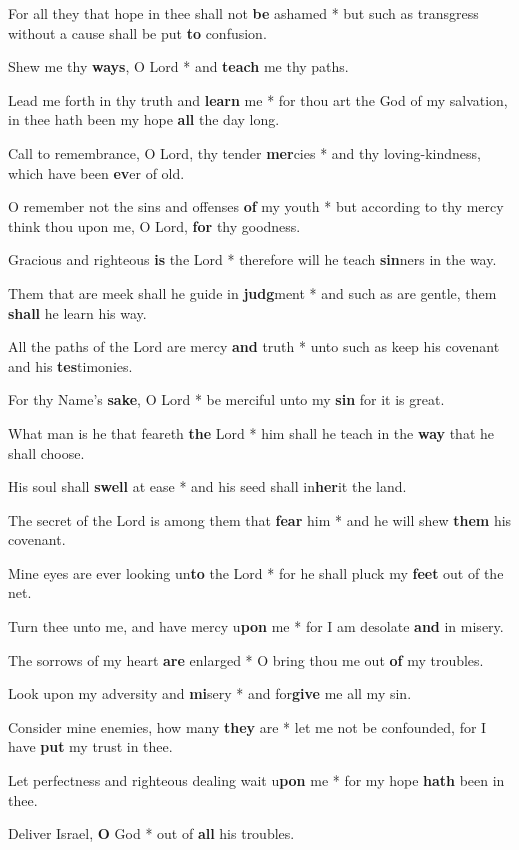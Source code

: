 \begin{multicols}{2}
	For all they that hope in thee shall not \textbf{be} ashamed * but such as transgress without a cause shall be put \textbf{to} confusion.
	
	Shew me thy \textbf{ways}, O Lord * and \textbf{teach} me thy paths.
	
	Lead me forth in thy truth and \textbf{learn} me * for thou art the God of my salvation, in thee hath been my hope \textbf{all} the day long.
	
	Call to remembrance, O Lord, thy tender \textbf{mer}cies * and thy loving-kindness, which have been \textbf{ev}er of old.
	
	O remember not the sins and offenses \textbf{of} my youth * but according to thy mercy think thou upon me, O Lord, \textbf{for} thy goodness.
	
	Gracious and righteous \textbf{is} the Lord * therefore will he teach \textbf{sin}ners in the way.
	
	Them that are meek shall he guide in \textbf{judg}ment * and such as are gentle, them \textbf{shall} he learn his way.
	
	All the paths of the Lord are mercy \textbf{and} truth * unto such as keep his covenant and his \textbf{tes}timonies.
	
	For thy Name's \textbf{sake}, O Lord * be merciful unto my \textbf{sin} for it is great.
	
	What man is he that feareth \textbf{the} Lord * him shall he teach in the \textbf{way} that he shall choose.
	
	His soul shall \textbf{swell} at ease * and his seed shall in\textbf{her}it the land.
	
	The secret of the Lord is among them that \textbf{fear} him * and he will shew \textbf{them} his covenant.
	
	Mine eyes are ever looking un\textbf{to} the Lord * for he shall pluck my \textbf{feet} out of the net.
	
	Turn thee unto me, and have mercy u\textbf{pon} me * for I am desolate \textbf{and} in misery.
	
	The sorrows of my heart \textbf{are} enlarged * O bring thou me out \textbf{of} my troubles.
	
	Look upon my adversity and \textbf{mi}sery * and for\textbf{give} me all my sin.
	
	Consider mine enemies, how many \textbf{they} are * let me not be confounded, for I have \textbf{put} my trust in thee.
	
	Let perfectness and righteous dealing wait u\textbf{pon} me * for my hope \textbf{hath} been in thee.
	
	Deliver Israel, \textbf{O} God * out of \textbf{all} his troubles.
\end{multicols}